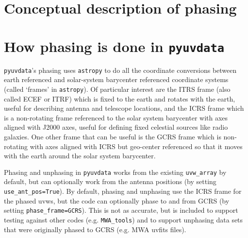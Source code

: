 \documentclass[11pt, oneside]{article}   	%
\begin{document}
\section{Conceptual description of phasing}


\section{How phasing is done in \texttt{pyuvdata}}
\texttt{pyuvdata}'s phasing uses \texttt{astropy} to do all the coordinate conversions between earth referenced and solar-system barycenter referenced coordinate systems (called `frames' in \texttt{astropy}). Of particular interest are the ITRS frame (also called ECEF or ITRF) which is fixed to the earth and rotates with the earth, useful for describing antenna and telescope locations, and the ICRS frame which is a non-rotating frame referenced to the solar system barycenter with axes aligned with J2000 axes, useful for defining fixed celestial sources like radio galaxies. One other frame that can be useful is the GCRS frame which is non-rotating with axes aligned with ICRS but geo-center referenced so that it moves with the earth around the solar system barycenter.

Phasing and unphasing in \texttt{pyuvdata} works from the existing \verb!uvw_array! by default, but can optionally work from the antenna positions (by setting \verb!use_ant_pos=True!). By default, phasing and unphasing use the ICRS frame for the phased uvws, but the code can optionally phase to and from GCRS (by setting \verb!phase_frame=GCRS!). This is not as accurate, but is included to support testing against other codes (e.g. \verb!MWA_tools!) and to support unphasing data sets that were originally phased to GCRS (e.g. MWA uvfits files).
\end{document}
